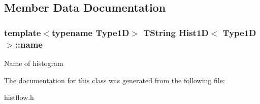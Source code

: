 \subsection{Member Data Documentation}
\subsubsection[{\texorpdfstring{name}{name}}]{\setlength{\rightskip}{0pt plus 5cm}template$<$typename Type1D$>$ T\+String {\bf Hist1D}$<$ Type1D $>$\+::name}\hypertarget{classHist1D_a28f350f4fd9e13199ef560ea6820d65c}{}\label{classHist1D_a28f350f4fd9e13199ef560ea6820d65c}
Name of histogram 

The documentation for this class was generated from the following file\+:\begin{DoxyCompactItemize}
\item 
histflow.\+h\end{DoxyCompactItemize}
